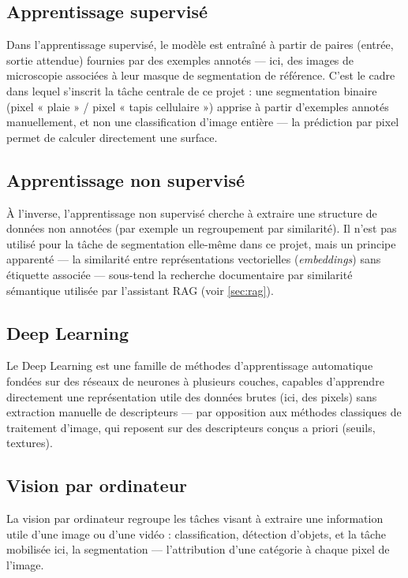 \documentclass[12pt,a4paper]{report}
\begin{document}
\subsection{Apprentissage supervisé}

Dans l'apprentissage supervisé, le modèle est entraîné à partir de paires (entrée, sortie attendue) fournies par des exemples annotés — ici, des images de microscopie associées à leur masque de segmentation de référence. C'est le cadre dans lequel s'inscrit la tâche centrale de ce projet : une segmentation binaire (pixel « plaie » / pixel « tapis cellulaire ») apprise à partir d'exemples annotés manuellement, et non une classification d'image entière — la prédiction par pixel permet de calculer directement une surface.

\subsection{Apprentissage non supervisé}

À l'inverse, l'apprentissage non supervisé cherche à extraire une structure de données non annotées (par exemple un regroupement par similarité). Il n'est pas utilisé pour la tâche de segmentation elle-même dans ce projet, mais un principe apparenté — la similarité entre représentations vectorielles (\textit{embeddings}) sans étiquette associée — sous-tend la recherche documentaire par similarité sémantique utilisée par l'assistant RAG (voir \ref{sec:rag}).

\subsection{Deep Learning}

Le Deep Learning est une famille de méthodes d'apprentissage automatique fondées sur des réseaux de neurones à plusieurs couches, capables d'apprendre directement une représentation utile des données brutes (ici, des pixels) sans extraction manuelle de descripteurs — par opposition aux méthodes classiques de traitement d'image, qui reposent sur des descripteurs conçus a priori (seuils, textures).

\subsection{Vision par ordinateur}

La vision par ordinateur regroupe les tâches visant à extraire une information utile d'une image ou d'une vidéo : classification, détection d'objets, et la tâche mobilisée ici, la segmentation — l'attribution d'une catégorie à chaque pixel de l'image.
\end{document}
